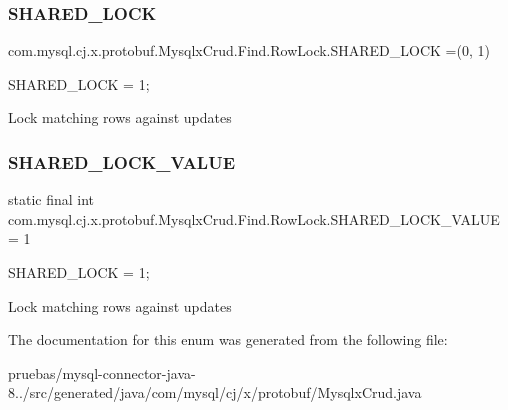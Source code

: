 \subsubsection{\texorpdfstring{S\+H\+A\+R\+E\+D\+\_\+\+L\+O\+CK}{SHARED\_LOCK}}
{\footnotesize\ttfamily com.\+mysql.\+cj.\+x.\+protobuf.\+Mysqlx\+Crud.\+Find.\+Row\+Lock.\+S\+H\+A\+R\+E\+D\+\_\+\+L\+O\+CK =(0, 1)}

{\ttfamily S\+H\+A\+R\+E\+D\+\_\+\+L\+O\+CK = 1;}


\begin{DoxyPre}
Lock matching rows against updates
\end{DoxyPre}
 \mbox{\label{enumcom_1_1mysql_1_1cj_1_1x_1_1protobuf_1_1_mysqlx_crud_1_1_find_1_1_row_lock_a9b593ba176e2c6d30e800321555455ca}} 
\subsubsection{\texorpdfstring{S\+H\+A\+R\+E\+D\+\_\+\+L\+O\+C\+K\+\_\+\+V\+A\+L\+UE}{SHARED\_LOCK\_VALUE}}
{\footnotesize\ttfamily  static  final int com.\+mysql.\+cj.\+x.\+protobuf.\+Mysqlx\+Crud.\+Find.\+Row\+Lock.\+S\+H\+A\+R\+E\+D\+\_\+\+L\+O\+C\+K\+\_\+\+V\+A\+L\+UE = 1\hspace{0.3cm}{\ttfamily [static]}}

{\ttfamily S\+H\+A\+R\+E\+D\+\_\+\+L\+O\+CK = 1;}


\begin{DoxyPre}
Lock matching rows against updates
\end{DoxyPre}
 

The documentation for this enum was generated from the following file\+:\begin{DoxyCompactItemize}
\item 
pruebas/mysql-\/connector-\/java-\/8../src/generated/java/com/mysql/cj/x/protobuf/Mysqlx\+Crud.\+java\end{DoxyCompactItemize}
